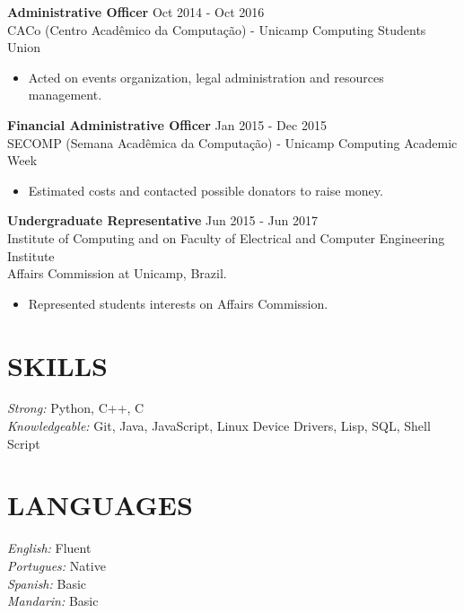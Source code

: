 \documentclass[margin, 10pt]{res} %
\begin{document}
\begin{resume}
{\bf Administrative Officer} \hfill Oct 2014 - Oct 2016 \\
CACo (Centro Acadêmico da Computação) - Unicamp Computing Students Union 
\begin{itemize} \itemsep -1pt %
\item Acted on events organization, legal administration and resources management.
\end{itemize}

{\bf Financial Administrative Officer} \hfill Jan 2015 - Dec 2015 \\
SECOMP (Semana Acadêmica da Computação) - Unicamp Computing Academic Week 
\begin{itemize} \itemsep -1pt %
\item Estimated costs and contacted possible donators to raise money.
\end{itemize}

{\bf Undergraduate Representative} \hfill Jun 2015 - Jun 2017 \\
Institute of Computing and on Faculty of Electrical and Computer Engineering Institute \\ Affairs Commission at Unicamp, Brazil. 
\begin{itemize} \itemsep -1pt %
\item Represented students interests on Affairs Commission.
\end{itemize}

\section{SKILLS} 
{\sl Strong:} Python, C++, C \\
{\sl Knowledgeable:} Git, Java, JavaScript, Linux Device Drivers, Lisp, SQL, Shell Script

\section{LANGUAGES}
{\sl English:} Fluent \\
{\sl Portugues:} Native \\
{\sl Spanish:} Basic \\
{\sl Mandarin:} Basic \\

\end{resume}
\end{document}
